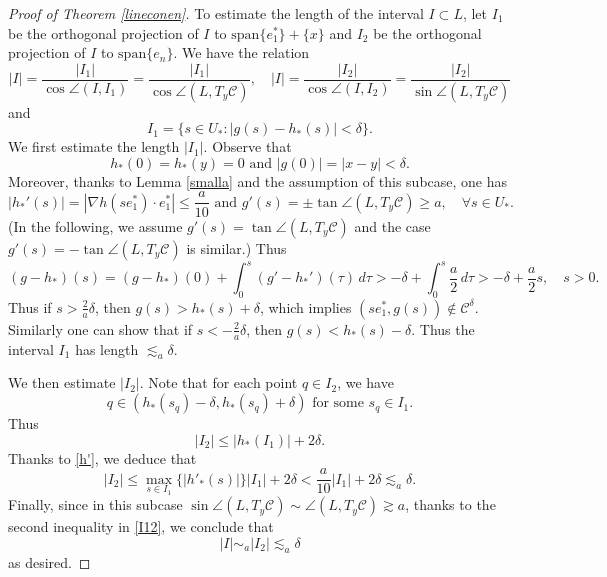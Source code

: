 \documentclass[11pt,a4paper,reqno]{amsart}
\newcommand{\calC}{\mathcal{C}}
\newcommand{\1}{\mathbf{1}}
\numberwithin{equation}{section}
\theoremstyle{plain}
\theoremstyle{definition}
\theoremstyle{remark}
\begin{document}
\begin{proof}[Proof of Theorem \ref{lineconen}]
     To estimate the length of the interval $I \subset L$,
     let $I_1$ be the orthogonal projection of $I$ to $\mbox{span}\{e_1^\ast\}+ \{x\}$ and $I_2$ be the orthogonal projection of $I$ to $\mbox{span}\{e_n\}$. We have the relation
     \begin{equation}\label{I12}
        |I| = \frac{|I_1|}{\cos \angle(I,I_1)} = \frac{|I_1|}{\cos \angle(L,T_y\calC )}, \quad
     |I| = \frac{|I_2|}{\cos \angle(I,I_2)} = \frac{|I_2|}{\sin \angle(L,T_y\calC)}
     \end{equation}
     and
     $$ I_1 = \{s \in U_\ast: |g(s)-h_\ast(s)| < \delta\}. $$
     We first estimate the length $|I_1|$.
     Observe that
     $$  h_\ast(0) =  h_\ast(y) = 0 \mbox{ and } |g(0)|=|x-y| < \delta. $$
     Moreover, thanks to Lemma \ref{smalla} and the assumption of this subcase, one has
     \begin{equation}\label{h'}
       |h_\ast'(s)|= |\nabla h(se_1^\ast) \cdot e_1^\ast| \le \frac{a}{10} \mbox{ and } g'(s)= \pm\tan \angle (L,T_y\calC) \ge a, \quad  \forall s\in U_\ast.
     \end{equation}
     (In the following, we assume $g'(s)= \tan \angle (L,T_y\calC)$ and the case $g'(s)= -\tan \angle (L,T_y\calC)$ is similar.)
     Thus
     $$  (g-h_\ast)(s) = (g-h_\ast)(0) + \int_0^s (g'-h_\ast')(\tau) \, d\tau > -\delta + \int_0^s \frac{a}{2} \, d\tau > -\delta + \frac{a}{2}s, \quad s>0. $$
     Thus if $s> \frac{2}{a}\delta$, then $g(s)>h_\ast(s)+\delta$, which implies $(se_1^\ast,g(s)) \notin \calC^\delta$. Similarly one can show that if $s< -\frac{2}{a}\delta$, then $g(s)< h_\ast(s)-\delta$.
     Thus the interval $I_1$ has length $\lesssim_a \delta$.

     We then estimate $|I_2|$.
     Note that for each point $q \in I_2$, we have
     $$  q \in (h_\ast(s_q)-\delta, h_\ast(s_q)+\delta) \mbox{ for some $s_q\in I_1$}.$$
     Thus
     $$  |I_2| \le |h_\ast(I_1)|+2\delta.   $$
      Thanks to \eqref{h'}, we deduce that
      $$  |I_2| \le \max_{s\in I_1}\{|h'_\ast(s)|\}|I_1|+2\delta < \frac{a}{10}|I_1|+2\delta \lesssim_a \delta.   $$
      Finally, since in this subcase $\sin \angle(L,T_y\calC) \sim \angle(L,T_y\calC) \gtrsim a$, thanks to the second inequality in \eqref{I12}, we conclude that
      $$  |I| \sim_a |I_2| \lesssim_a \delta   $$
      as desired.

%



\end{proof}
\end{document}
